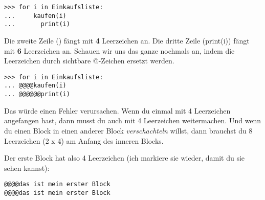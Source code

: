 \begin{Verbatim}[frame=single]
>>> for i in Einkaufsliste:
...     kaufen(i)
...       print(i)
\end{Verbatim}

Die zweite Zeile () fängt mit \textbf{4} Leerzeichen an. Die dritte Zeile (print(i)) fängt mit \textbf{6} Leerzeichen an. Schauen wir uns das ganze nochmals an, indem die Leerzeichen durch sichtbare @-Zeichen ersetzt werden.

\begin{Verbatim}[frame=single]
>>> for i in Einkaufsliste:
... @@@@kaufen(i)
... @@@@@@print(i)
\end{Verbatim}

Das würde einen Fehler verursachen. Wenn du einmal mit 4 Leerzeichen angefangen hast, dann musst du auch mit 4 Leerzeichen weitermachen. Und wenn du einen Block in einen anderer Block \emph{verschachteln} willst, dann brauchst du 8 Leerzeichen (2 x 4) am Anfang des inneren Blocks.
\par
Der erste Block hat also 4 Leerzeichen (ich markiere sie wieder, damit du sie sehen kannst):

\begin{Verbatim}[frame=single]
@@@@das ist mein erster Block
@@@@das ist mein erster Block
\end{Verbatim}

